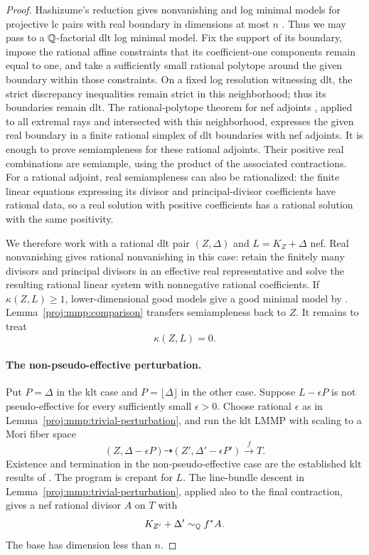 \begin{proof}
Hashizume's reduction gives nonvanishing and log minimal models
for projective lc pairs with real boundary in dimensions at most
\(n\) \cite[Theorem~1.4]{Proj-Hashizume2018}.
Thus we may pass to a \(\mathbb{Q}\)-factorial dlt log minimal model.
Fix the support of its boundary, impose the rational affine
constraints that its coefficient-one components remain equal
to one, and take a sufficiently small rational polytope around
the given boundary within those constraints. On a fixed log
resolution witnessing dlt, the strict discrepancy inequalities
remain strict in this neighborhood; thus its boundaries remain
dlt. The rational-polytope theorem for nef adjoints
\cite[Remark~3.1 and Proposition~3.2(3)]{Proj-Birkar2011II}, applied
to all extremal rays and intersected with this neighborhood,
expresses the given real boundary in a finite rational simplex
of dlt boundaries with nef adjoints.
It is enough to prove semiampleness for these
rational adjoints. Their positive real combinations are
semiample, using the product of the associated contractions.
For a rational adjoint, real semiampleness can also be
rationalized: the finite linear equations expressing its
divisor and principal-divisor coefficients have rational data,
so a real solution with positive coefficients has a rational
solution with the same positivity.

We therefore work with a rational dlt pair \((Z,\Delta)\) and
\(L=K_Z+\Delta\) nef.
Real nonvanishing gives rational nonvanishing in this case:
retain the finitely many divisors and principal divisors in
an effective real representative and solve the resulting
rational linear system with nonnegative rational coefficients.
If \(\kappa(Z,L)\geq 1\), lower-dimensional good models give a
good minimal model by \cite[Lemma~3.5]{Proj-FujinoGongyoRings2014}.
Lemma~\ref{proj:mmp:comparison} transfers semiampleness back to \(Z\).
It remains to treat
\[
 \kappa(Z,L)=0.
\]

\paragraph{The non-pseudo-effective perturbation.}
Put \(P=\Delta\) in the klt case and
\(P=\lfloor\Delta\rfloor\) in the other case.
Suppose \(L-\epsilon P\) is not pseudo-effective for every
sufficiently small \(\epsilon>0\).
Choose rational \(\epsilon\) as in
Lemma~\ref{proj:mmp:trivial-perturbation}, and run the klt LMMP
with scaling to a Mori fiber space
\[
 (Z,\Delta-\epsilon P)\dashrightarrow
 (Z',\Delta'-\epsilon P')\xrightarrow{f} T.
\]
Existence and termination in the non-pseudo-effective case are
the established klt results of \cite{BCHM}.
The program is crepant for \(L\).
The line-bundle descent in
Lemma~\ref{proj:mmp:trivial-perturbation}, applied also to the final
contraction, gives a nef rational divisor \(A\) on \(T\) with
\[
 K_{Z'}+\Delta'\sim_{\mathbb{Q}}f^*A.
\]
The base has dimension less than \(n\).


\end{proof}

